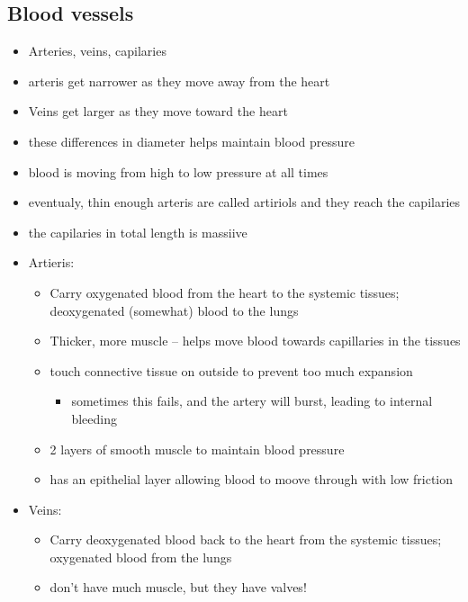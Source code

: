 \documentclass{article}
\theoremstyle{definition}
\begin{document}
\subsection{Blood vessels}
\begin{itemize}
	\item Arteries, veins, capilaries
	\item arteris get narrower as they move away from the heart
	\item Veins get larger as they move toward the heart
	\item these differences in diameter helps maintain blood pressure
	\item blood is moving from high to low pressure at all times
	\item eventualy, thin enough arteris are called artiriols and they reach the capilaries
	\item the capilaries in total length is massiive
	\item Artieris:
		\begin{itemize}
			\item Carry oxygenated blood from the heart to the systemic tissues; deoxygenated (somewhat) blood to the lungs
			\item Thicker, more muscle -- helps move blood towards capillaries in the tissues
			\item touch connective tissue on outside to prevent too much expansion
				\begin{itemize}
					\item sometimes this fails, and the artery will burst, leading to internal bleeding
				\end{itemize}
			\item 2 layers of smooth muscle to maintain blood pressure
			\item has an epithelial layer allowing blood to moove through with low friction
		\end{itemize}
	\item Veins:
		\begin{itemize}
			\item Carry deoxygenated blood back to the heart from the systemic tissues; oxygenated blood from the lungs
			\item don't have much muscle, but they have valves!
		\end{itemize}
\end{itemize}
\end{document}
